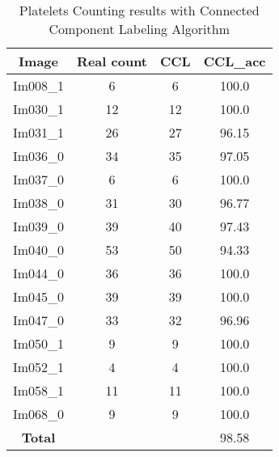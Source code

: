 \begin{table}[H]
\centering
\begin{tabular}{|  c | c | c | c |}
\hline
\textbf{Image} & \textbf{Real count} & \textbf{CCL} & \textbf{CCL\_acc} \\
\hline
Im008\_1 & 6 & 6  & 100.0 \\
Im030\_1 & 12 & 12  & 100.0 \\
Im031\_1 & 26 & 27  & 96.15 \\
Im036\_0 & 34 & 35  & 97.05 \\
Im037\_0 & 6 & 6  & 100.0 \\
Im038\_0 & 31 & 30  & 96.77 \\
Im039\_0 & 39 & 40  & 97.43 \\
Im040\_0 & 53 & 50  & 94.33 \\
Im044\_0 & 36 & 36  & 100.0 \\
Im045\_0 & 39 & 39  & 100.0 \\
Im047\_0 & 33 & 32  & 96.96 \\
Im050\_1 & 9 & 9  & 100.0 \\
Im052\_1 & 4 & 4  & 100.0 \\
Im058\_1 & 11 & 11  & 100.0 \\
Im068\_0 & 9 & 9  & 100.0 \\
\hline
\textbf{Total} &  &  & 98.58\\
\hline
\end{tabular}
\caption{Platelets Counting results with Connected Component Labeling Algorithm}
\label{table:PLT_UNET_RESULT}
\end{table}